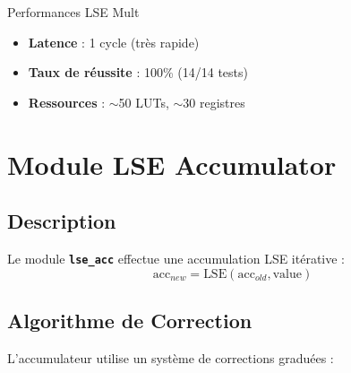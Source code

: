 \documentclass[12pt,a4paper]{article}
\newcommand{\module}[1]{\textbf{\texttt{#1}}}
\begin{document}
\begin{successbox}{Performances LSE Mult}
\begin{itemize}
    \item \textbf{Latence} : 1 cycle (très rapide)
    \item \textbf{Taux de réussite} : 100\% (14/14 tests)
    \item \textbf{Ressources} : $\sim$50 LUTs, $\sim$30 registres
\end{itemize}
\end{successbox}

\section{Module LSE Accumulator}

\subsection{Description}

Le module \module{lse\_acc} effectue une accumulation LSE itérative :
\begin{equation}
\text{acc}_{new} = \text{LSE}(\text{acc}_{old}, \text{value})
\end{equation}

\subsection{Algorithme de Correction}

L'accumulateur utilise un système de corrections graduées :
\end{document}

